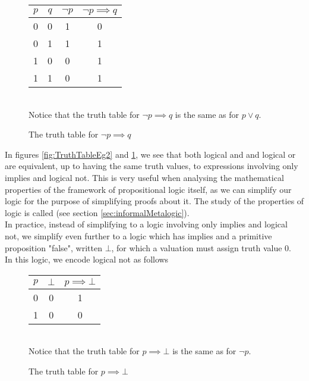 \documentclass[11pt]{article}
\begin{document}
\begin{figure}[H]
    \caption{The truth table for $\neg p \implies q$}
    \label{fig:TruthTableEg3}
    \centering
    \begin{tabular}{|c|c|c|c|}
        \hline
        $p$ & $q$ & $\neg p$ & $\neg p \implies q$ \\ \hline
        0 & 0 & 1 & 0  \\
        0 & 1 & 1 & 1 \\
        1 & 0 & 0 & 1  \\
        1 & 1 & 0 & 1 \\ \hline
    \end{tabular}
    \vspace{10pt}\\ Notice that the truth table for $\neg p \implies q$ is the same as for $p \lor q$.
\end{figure}
\pagebreak
\begin{sidenote}
    In figures \ref{fig:TruthTableEg2} and \ref{fig:TruthTableEg3}, we see that both logical and and logical or are equivalent, up to having the same truth values, to expressions involving only implies and logical not. This is very useful when analysing the mathematical properties of the framework of propositional logic itself, as we can simplify our logic for the purpose of simplifying proofs about it. The study of the properties of logic is called  (see section \ref{sec:informalMetalogic}).
    \\ In practice, instead of simplifying to a logic involving only implies and logical not, we simplify even further to a logic which has implies and a primitive proposition "false", written $\bot$, for which a valuation must assign truth value 0.
    \\ In this logic, we encode logical not as follows
\begin{figure}[H]
    \caption{The truth table for $p \implies \bot$}
    \label{fig:TruthTableEg4}
    \centering
    \begin{tabular}{|c|c|c|}
        \hline
        $p$ & $\bot$ & $p \implies \bot$ \\ \hline
        0 & 0 & 1  \\
        1 & 0 & 0   \\\hline
    \end{tabular}
    \vspace{10pt}\\ Notice that the truth table for $ p \implies \bot$ is the same as for $\neg p$.
\end{figure}
\end{sidenote}
\end{document}
